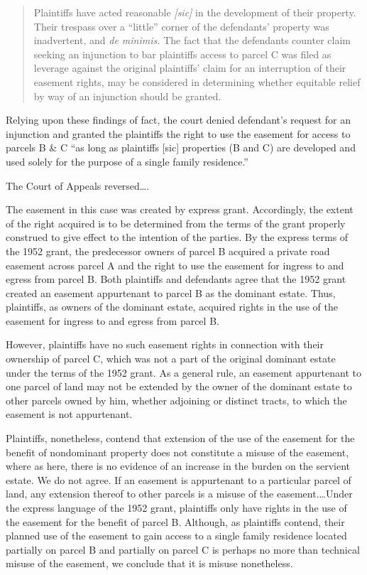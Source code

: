 \begin{quote}
Plaintiffs have acted reasonable \textit{[sic]} in the development of their
property. Their trespass over a ``little'' corner of the defendants' property
was inadvertent, and \textit{de minimis.} The fact that the defendants counter
claim seeking an injunction to bar plaintiffs access to parcel C was filed as
leverage against the original plaintiffs' claim for an interruption of their
easement rights, may be considered in determining whether equitable relief by
way of an injunction should be granted.
\end{quote}

Relying upon these findings of fact, the court denied defendant's request for an
injunction and granted the plaintiffs the right to use the easement for access
to parcels B \& C ``as long as plaintiffs [sic] properties (B and C) are
developed and used solely for the purpose of a single family residence.''

The Court of Appeals reversed\ldots.

The easement in this case was created by express grant. Accordingly, the extent
of the right acquired is to be determined from the terms of the grant properly
construed to give effect to the intention of the parties.  By the express terms
of the 1952 grant, the predecessor owners of parcel B acquired a private road
easement across parcel A and the right to use the easement for ingress to and
egress from parcel B. Both plaintiffs and defendants agree that the 1952 grant
created an easement appurtenant to parcel B as the dominant estate. Thus,
plaintiffs, as owners of the dominant estate, acquired rights in the use of the
easement for ingress to and egress from parcel B.

However, plaintiffs have no such easement rights in connection with their
ownership of parcel C, which was not a part of the original dominant estate
under the terms of the 1952 grant. As a general rule, an easement appurtenant to
one parcel of land may not be extended by the owner of the dominant estate to
other parcels owned by him, whether adjoining or distinct tracts, to which the
easement is not appurtenant. 

Plaintiffs, nonetheless, contend that extension of the use of the easement for
the benefit of nondominant property does not constitute a misuse of the
easement, where as here, there is no evidence of an increase in the burden on
the servient estate. We do not agree. If an easement is appurtenant to a
particular parcel of land, any extension thereof to other parcels is a misuse of
the easement.\ldots Under the express language of the 1952 grant, plaintiffs
only have rights in the use of the easement for the benefit of parcel B.
Although, as plaintiffs contend, their planned use of the easement to gain
access to a single family residence located partially on parcel B and partially
on parcel C is perhaps no more than technical misuse of the easement, we
conclude that it is misuse nonetheless.


